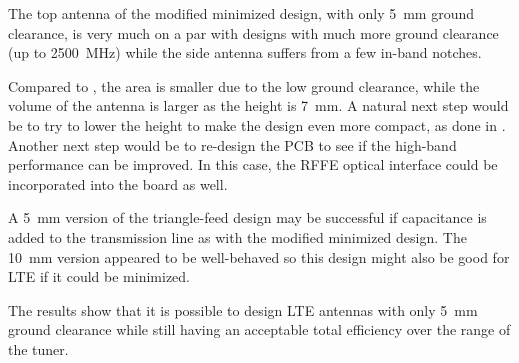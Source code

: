 The top antenna of the modified minimized design, with only \SI{5}{mm} ground clearance, is very much on a par with designs with much more ground clearance (up to \SI{2500}{MHz}) while the side antenna suffers from a few in-band notches. 

Compared to \cite{ilvonen2014multiband}, the area is smaller due to the low ground clearance, while the volume of the antenna is larger as the height is \SI{7}{mm}. A natural next step would be to try to lower the height to make the design even more compact, as done in \cite{ilvonen2014multiband}. Another next step would be to re-design the PCB to see if the high-band performance can be improved. In this case, the RFFE optical interface could be incorporated into the board as well.

A \SI{5}{mm} version of the triangle-feed design may be successful if capacitance is added to the transmission line as with the modified minimized design. The \SI{10}{mm} version appeared to be well-behaved so this design might also be good for LTE if it could be minimized.

The results show that it is possible to design LTE antennas with only \SI{5}{mm} ground clearance while still having an acceptable total efficiency over the range of the tuner.
